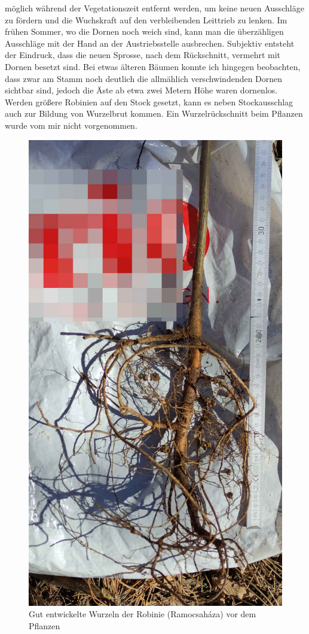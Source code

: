 \documentclass[twocolumn]{scrartcl}
\begin{document}
möglich während der Vegetationszeit entfernt werden, um keine neuen
Ausschläge zu fördern und die Wuchskraft auf den verbleibenden
Leittrieb zu lenken.
Im frühen Sommer, wo die Dornen noch weich sind, kann man die
überzähligen Ausschläge mit der Hand an der Austriebsstelle
ausbrechen.
Subjektiv entsteht der Eindruck, dass die neuen
Sprosse, nach dem Rückschnitt, vermehrt mit Dornen besetzt sind.
Bei etwas älteren Bäumen konnte ich hingegen beobachten, dass zwar am
Stamm noch deutlich die allmählich verschwindenden Dornen sichtbar
sind, jedoch die Äste ab etwa zwei Metern Höhe waren dornenlos.
Werden größere Robinien auf den Stock gesetzt, kann es neben
Stockausschlag auch zur Bildung von Wurzelbrut kommen. Ein
Wurzelrückschnitt beim Pflanzen wurde vom mir nicht vorgenommen.

\begin{figure}[htbp]
  \centering
  \includegraphics[width=.9\linewidth]{./bild/wurzelRobinie}
  \caption{Gut entwickelte Wurzeln der Robinie (Ramocsaháza) vor dem Pflanzen}
  \label{fig:wurzelRobinie}
\end{figure}
\end{document}
